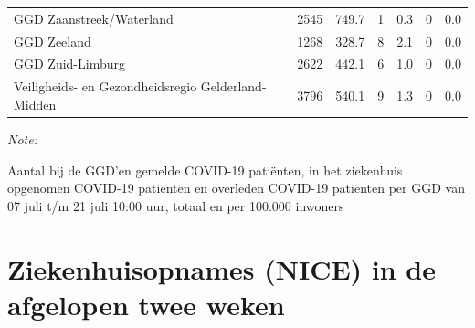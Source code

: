 \documentclass[
  english,
  man,floatsintext]{apa6}
\begin{document}
\begin{table}
\begin{threeparttable}
\begin{tabular}{lrrrrrr}
GGD Zaanstreek/Waterland & 2545 & 749.7 & 1 & 0.3 & 0 & 0.0\\
GGD Zeeland & 1268 & 328.7 & 8 & 2.1 & 0 & 0.0\\
GGD Zuid-Limburg & 2622 & 442.1 & 6 & 1.0 & 0 & 0.0\\
Veiligheids- en Gezondheidsregio Gelderland-Midden & 3796 & 540.1 & 9 & 1.3 & 0 & 0.0\\
\bottomrule
\end{tabular}
\begin{tablenotes}
\item \textit{Note: } 
\item Aantal bij de GGD’en gemelde COVID-19 patiënten, in het ziekenhuis opgenomen COVID-19 patiënten en overleden COVID-19 patiënten per GGD van 07 juli t/m 21 juli 10:00 uur, totaal en per 100.000 inwoners
\end{tablenotes}
\end{threeparttable}
\endgroup{}
\end{table}

\newpage

\hypertarget{ziekenhuisopnames-nice-in-de-afgelopen-twee-weken}{%
\section{Ziekenhuisopnames (NICE) in de afgelopen twee weken}\label{ziekenhuisopnames-nice-in-de-afgelopen-twee-weken}}
\end{document}
